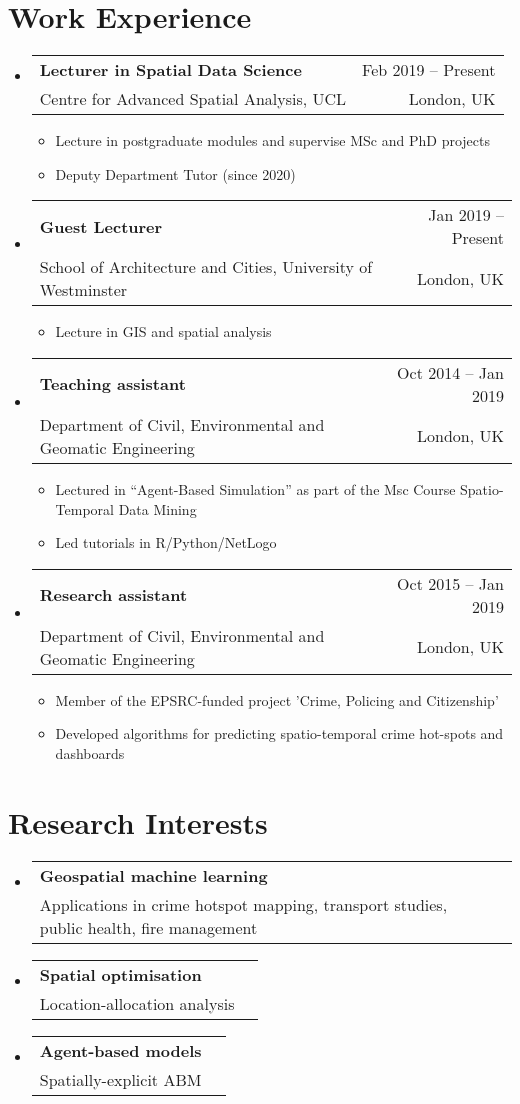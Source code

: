 \documentclass[A4,11pt]{article}
\makeatletter
\newcommand{\CVItem}[1]{
  \item\small{
    {#1 \vspace{-2pt}}
  }
}
\newcommand{\CVSubheading}[4]{
  \vspace{-2pt}\item
    \begin{tabular*}{0.97\textwidth}[t]{l@{\extracolsep{\fill}}r}
      \textbf{#1} & #2 \\
      \small#3 & \small #4 \\
    \end{tabular*}\vspace{-7pt}
}
\newcommand{\CVSubHeadingListStart}{\begin{itemize}[leftmargin=0.5cm, label={}]}
\newcommand{\CVSubHeadingListEnd}{\end{itemize}}
\newcommand{\CVItemListStart}{\begin{itemize}}
\newcommand{\CVItemListEnd}{\end{itemize}\vspace{-5pt}}
\makeatother
\begin{document}
\section{Work Experience}
  \CVSubHeadingListStart
    \CVSubheading
      {Lecturer in Spatial Data Science}{Feb 2019 -- Present}
      {Centre for Advanced Spatial Analysis, UCL}{London, UK}
      \CVItemListStart
        \CVItem{Lecture in postgraduate modules and supervise MSc and PhD projects}        
        \CVItem{Deputy Department Tutor (since 2020)}
      \CVItemListEnd
    \CVSubheading
      {Guest Lecturer}{Jan 2019 -- Present}
      {School of Architecture and Cities, University of Westminster}{London, UK}
      \CVItemListStart
        \CVItem{Lecture in GIS and spatial analysis}
    \CVItemListEnd
    \CVSubheading
      {Teaching assistant}{Oct 2014 -- Jan 2019}
      {Department of Civil, Environmental and Geomatic Engineering}{London, UK}
      \CVItemListStart
        \CVItem{Lectured in “Agent-Based Simulation” as part of the Msc Course Spatio-Temporal Data Mining}
        \CVItem{Led tutorials in R/Python/NetLogo}
      \CVItemListEnd
     \CVSubheading
      {Research assistant}{Oct 2015 -- Jan 2019}
      {Department of Civil, Environmental and Geomatic Engineering}{London, UK}
      \CVItemListStart
        \CVItem{Member of the EPSRC-funded project 'Crime, Policing and Citizenship'}
        \CVItem{Developed algorithms for predicting spatio-temporal crime hot-spots and dashboards}
      \CVItemListEnd
  \CVSubHeadingListEnd

\begin{comment}
try to briefly explain what you did and why it is relevant to the position you
are seeking
\end{comment}

\section{Research Interests}
  \CVSubHeadingListStart
    \CVSubheading
      {Geospatial machine learning}{}
      {Applications in crime hotspot mapping, transport studies, public health, fire management}{}
    \CVSubheading
      {Spatial optimisation}{}
      {Location-allocation analysis}{}
    \CVSubheading
      {Agent-based models}{}
      {Spatially-explicit ABM}{}
  \CVSubHeadingListEnd
\end{document}
